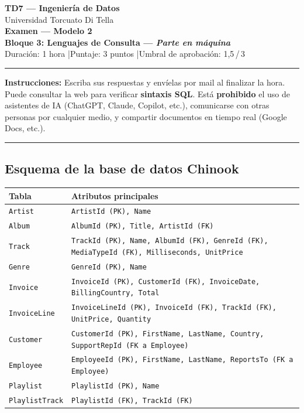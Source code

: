 \documentclass[11pt,a4paper]{article}
\begin{document}
\begin{center}
  {\LARGE\bfseries TD7 — Ingeniería de Datos}\\[6pt]
  {\large Universidad Torcuato Di Tella}\\[4pt]
  {\Large\bfseries Examen — Modelo 2}\\[2pt]
  {\large\bfseries Bloque 3: Lenguajes de Consulta \textnormal{---} \textit{Parte en máquina}}\\[4pt]
  {\normalsize Duración: 1 hora \quad|\quad Puntaje: 3 puntos \quad|\quad Umbral de aprobación: 1{,}5\,/\,3}
\end{center}
\noindent\rule{\linewidth}{0.8pt}
\vspace{2pt}

\noindent\textbf{Instrucciones:} Escriba sus respuestas y envíelas por mail al finalizar la hora. Puede consultar la web para verificar \textbf{sintaxis SQL}. Está \textbf{prohibido} el uso de asistentes de IA (ChatGPT, Claude, Copilot, etc.), comunicarse con otras personas por cualquier medio, y compartir documentos en tiempo real (Google Docs, etc.).

\vspace{6pt}
\noindent\rule{\linewidth}{0.4pt}

\subsection*{Esquema de la base de datos Chinook}

\begin{center}\small
\begin{tabular}{ll}
\toprule
\textbf{Tabla} & \textbf{Atributos principales} \\
\midrule
\texttt{Artist}       & \texttt{ArtistId (PK), Name} \\
\texttt{Album}        & \texttt{AlbumId (PK), Title, ArtistId (FK)} \\
\texttt{Track}        & \texttt{TrackId (PK), Name, AlbumId (FK), GenreId (FK), MediaTypeId (FK), Milliseconds, UnitPrice} \\
\texttt{Genre}        & \texttt{GenreId (PK), Name} \\
\texttt{Invoice}      & \texttt{InvoiceId (PK), CustomerId (FK), InvoiceDate, BillingCountry, Total} \\
\texttt{InvoiceLine}  & \texttt{InvoiceLineId (PK), InvoiceId (FK), TrackId (FK), UnitPrice, Quantity} \\
\texttt{Customer}     & \texttt{CustomerId (PK), FirstName, LastName, Country, SupportRepId (FK a Employee)} \\
\texttt{Employee}     & \texttt{EmployeeId (PK), FirstName, LastName, ReportsTo (FK a Employee)} \\
\texttt{Playlist}     & \texttt{PlaylistId (PK), Name} \\
\texttt{PlaylistTrack}& \texttt{PlaylistId (FK), TrackId (FK)} \\
\bottomrule
\end{tabular}
\end{center}
\end{document}
